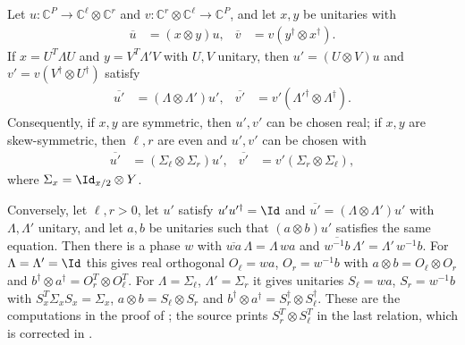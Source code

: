 \begin{lemma}
    \label{lem:mpu_conjugation_gate_gauge}
    \leanok
    Let $u:\mathbb C^P\to\mathbb C^\ell\otimes\mathbb C^r$ and
    $v:\mathbb C^r\otimes\mathbb C^\ell\to\mathbb C^P$, and let $x,y$ be
    unitaries with
    \begin{align}
        \overline u & =(x\otimes y)u, & \overline v & =v(y^\dagger\otimes x^\dagger).
    \end{align}
    If $x=U^T\Lambda U$ and $y=V^T\Lambda'V$ with $U,V$ unitary, then
    $u'=(U\otimes V)u$ and $v'=v(V^\dagger\otimes U^\dagger)$ satisfy
    \begin{align}
        \overline{u'} & =(\Lambda\otimes\Lambda')u',                 &
        \overline{v'} & =v'(\Lambda'^\dagger\otimes\Lambda^\dagger).
    \end{align}
    Consequently, if $x,y$ are symmetric, then $u',v'$ can be chosen real; if
    $x,y$ are skew-symmetric, then $\ell,r$ are even and $u',v'$ can be chosen
    with
    \begin{align}
        \overline{u'} & =(\Sigma_\ell\otimes\Sigma_r)u', &
        \overline{v'} & =v'(\Sigma_r\otimes\Sigma_\ell),
    \end{align}
    where $\Sigma_x=\Id_{x/2}\otimes Y$.

    Conversely, let $\ell,r>0$, let $u'$ satisfy $u'u'^\dagger=\Id$ and
    $\overline{u'}=(\Lambda\otimes\Lambda')u'$ with $\Lambda,\Lambda'$
    unitary, and let $a,b$ be unitaries such that $(a\otimes b)u'$ satisfies
    the same equation. Then there is a phase $w$ with
    $\overline{wa}\,\Lambda=\Lambda\,wa$ and
    $\overline{w^{-1}b}\,\Lambda'=\Lambda'\,w^{-1}b$. For $\Lambda=\Lambda'=\Id$
    this gives real orthogonal $O_\ell=wa$, $O_r=w^{-1}b$ with
    $a\otimes b=O_\ell\otimes O_r$ and
    $b^\dagger\otimes a^\dagger=O_r^T\otimes O_\ell^T$. For
    $\Lambda=\Sigma_\ell$, $\Lambda'=\Sigma_r$ it gives unitaries
    $S_\ell=wa$, $S_r=w^{-1}b$ with $S_x^T\Sigma_xS_x=\Sigma_x$,
    $a\otimes b=S_\ell\otimes S_r$ and
    $b^\dagger\otimes a^\dagger=S_r^\dagger\otimes S_\ell^\dagger$.
    These are the computations in the proof of
    \cite[Proposition~V.2]{Cirac2017MPU}; the source prints $S_r^T\otimes
        S_\ell^T$ in the last relation, which is corrected in
    \cite{gap:mpu_conjugation_symplectic_uniqueness_transpose}.
\end{lemma}


